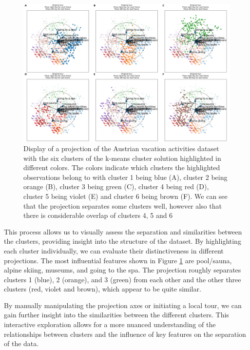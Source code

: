 \documentclass[article]{ajs}
\begin{document}
\begin{figure}[h!]
    \centering
    \includegraphics[width=1\textwidth]{winter_activ_cluster_highlights.png}
    \caption{Display of a projection of the Austrian vacation activities dataset with the six clusters of the k-means cluster solution highlighted in different colors. The colors indicate which clusters the highlighted observations belong to with cluster 1 being blue (A), cluster 2 being orange (B), cluster 3 being green (C), cluster 4 being red (D), cluster 5 being violet (E) and cluster 6 being brown (F). We can see that the projection separates some clusters well, however also that there is considerable overlap of clusters 4, 5 and 6}
    \label{fig:winter_activ_cluster_highlights}
\end{figure}

This process allows us to visually assess the separation and similarities between the clusters, providing insight into the structure of the dataset. By highlighting each cluster individually, we can evaluate their distinctiveness in different projections. The most influential features shown in Figure \ref{fig:winter_activ_cluster_highlights} are pool/sauna, alpine skiing, museums, and going to the spa. The projection roughly separates clusters 1 (blue), 2 (orange), and 3 (green) from each other and the other three clusters (red, violet and brown), which appear to be quite similar. 

By manually manipulating the projection axes or initiating a local tour, we can gain further insight into the similarities between the different clusters. This interactive exploration allows for a more nuanced understanding of the relationships between clusters and the influence of key features on the separation of the data.
\end{document}
